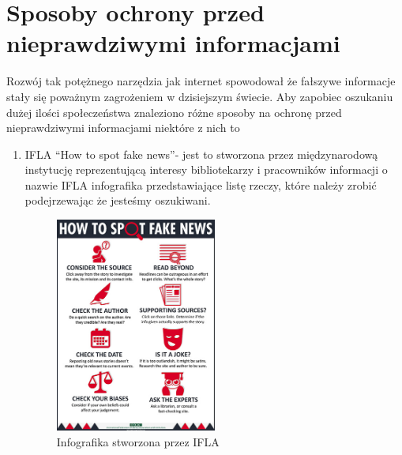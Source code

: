 \section{Sposoby ochrony przed nieprawdziwymi informacjami}
Rozwój tak potężnego narzędzia jak internet spowodował że fałszywe informacje
stały się poważnym zagrożeniem  w dzisiejszym świecie. Aby zapobiec oszukaniu 
dużej ilości społeczeństwa znaleziono różne sposoby na ochronę przed nieprawdziwymi
informacjami niektóre z nich to 
\begin{enumerate}
    \item IFLA ``How to spot fake news''- jest to stworzona przez międzynarodową instytucję
    reprezentującą interesy bibliotekarzy i pracowników informacji o nazwie IFLA infografika
    przedstawiające listę rzeczy, które należy zrobić podejrzewając że jesteśmy oszukiwani.

    \begin{figure}[h!]
        \centering
        \includegraphics[width=0.5\textwidth]{./Img/how-to-spot-fake-news.jpg}
        \caption{Infografika stworzona przez IFLA}
    \end{figure}


\end{enumerate}
